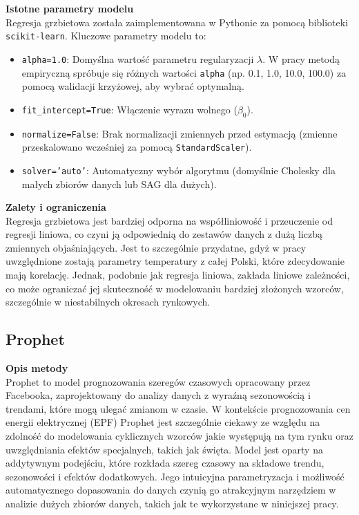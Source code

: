 \textbf{Istotne parametry modelu} \\
Regresja grzbietowa została zaimplementowana w Pythonie za pomocą biblioteki \texttt{scikit-learn}. Kluczowe parametry modelu to:
\begin{itemize}
    \item \texttt{alpha=1.0}: Domyślna wartość parametru regularyzacji \( \lambda \). W pracy metodą empiryczną spróbuje się różnych wartości \texttt{alpha} (np. 0.1, 1.0, 10.0, 100.0) za pomocą walidacji krzyżowej, aby wybrać optymalną.
    \item \texttt{fit\_intercept=True}: Włączenie wyrazu wolnego (\( \beta_0 \)).
    \item \texttt{normalize=False}: Brak normalizacji zmiennych przed estymacją (zmienne przeskalowano wcześniej za pomocą \texttt{StandardScaler}).
    \item \texttt{solver='auto'}: Automatyczny wybór algorytmu (domyślnie Cholesky dla małych zbiorów danych lub SAG dla dużych).
\end{itemize}

\textbf{Zalety i ograniczenia} \\
Regresja grzbietowa jest bardziej odporna na współliniowość i przeuczenie od regresji liniowa, co czyni ją odpowiednią do zestawów danych z dużą liczbą zmiennych objaśniających. Jest to szczególnie przydatne, gdyż w pracy uwzględnione zostają parametry temperatury z całej Polski, które zdecydowanie mają korelację. Jednak, podobnie jak regresja liniowa, zakłada liniowe zależności, co może ograniczać jej skuteczność w modelowaniu bardziej złożonych wzorców, szczególnie w niestabilnych okresach rynkowych.

\subsection{Prophet}
\label{subsec:prophet}

\textbf{Opis metody} \\
Prophet \cite{prophet_doc} to model prognozowania szeregów czasowych opracowany przez Facebooka, zaprojektowany do analizy danych z wyraźną sezonowością i trendami, które mogą ulegać zmianom w czasie. W kontekście prognozowania cen energii elektrycznej (EPF) Prophet jest szczególnie ciekawy ze względu na zdolność do modelowania cyklicznych wzorców jakie występują na tym rynku oraz uwzględniania efektów specjalnych, takich jak święta. Model jest oparty na addytywnym podejściu, które rozkłada szereg czasowy na składowe trendu, sezonowości i efektów dodatkowych. Jego intuicyjna parametryzacja i możliwość automatycznego dopasowania do danych czynią go atrakcyjnym narzędziem w analizie dużych zbiorów danych, takich jak te wykorzystane w niniejszej pracy.

